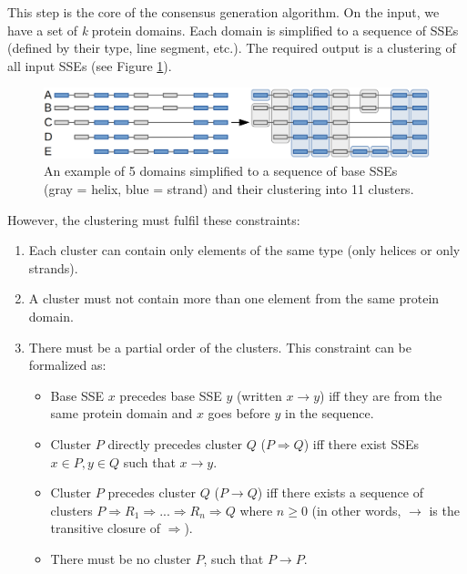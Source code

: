 \documentclass{article}
\begin{document}
This step is the core of the consensus generation algorithm. On the input, we
have a set of \emph{k} protein domains. Each domain is simplified to a
sequence of SSEs (defined by their type, line segment, etc.). 
The required output is a clustering of all input SSEs (see Figure \ref{fig:clusters}).

\begin{figure}[h!]
  \centering\includegraphics[width=\linewidth]{figures/clusters.png}
  \caption{An example of 5 domains simplified to a sequence of base SSEs 
  (gray = helix, blue = strand) and their clustering into 11 clusters.}
  \label{fig:clusters}
\end{figure}

However, the clustering must fulfil these constraints:

\begin{enumerate}
\def\labelenumi{\arabic{enumi}.}
\item
  Each cluster can contain only elements of the same type (only helices
  or only strands).
\item
  A cluster must not contain more than one element from the same protein
  domain.
\item
  There must be a partial order of the clusters. This constraint can be formalized as:
  \begin{itemize}
    \item
      Base SSE \(x\) precedes base SSE \(y\) (written \(x \rightarrow y\)) iff they
      are from the same protein domain and \(x\) goes before \(y\) in the sequence.
    \item
      Cluster \(P\) directly precedes cluster \(Q\) (\(P \Rightarrow Q\)) iff there
      exist SSEs \(x \in P, y \in Q\) such that \(x \rightarrow y\).
    \item
      Cluster \(P\) precedes cluster \(Q\) (\(P \rightarrow Q\)) iff there
      exists a sequence of clusters \(P \Rightarrow R_1 \Rightarrow ... 
      \Rightarrow R_n \Rightarrow Q\) where \(n \geq 0\) (in other words, \(\rightarrow\) 
      is the transitive closure of \(\Rightarrow\)).
    \item
      There must be no cluster \(P\), such that \(P \rightarrow P\).
  \end{itemize}
\end{enumerate}
\end{document}
